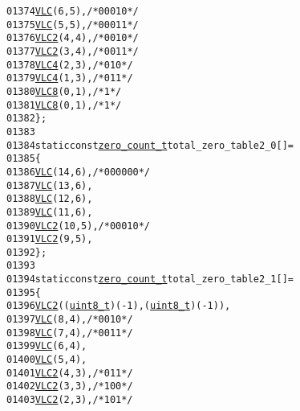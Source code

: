 \begin{footnotesize}
\begin{alltt}
01374         \hyperlink{vlc_8h_a7f3572774a720fd9b4bc3b1a0b65082f}{VLC}(6, 5), \textcolor{comment}{/* 0001 0 */}
01375         \hyperlink{vlc_8h_a7f3572774a720fd9b4bc3b1a0b65082f}{VLC}(5, 5), \textcolor{comment}{/* 0001 1 */}
01376         \hyperlink{vlc_8h_ad3cda36b9c6132357c7f7de5e52a6c93}{VLC2}(4, 4),\textcolor{comment}{/* 0010 */}
01377         \hyperlink{vlc_8h_ad3cda36b9c6132357c7f7de5e52a6c93}{VLC2}(3, 4),\textcolor{comment}{/* 0011 */}
01378         \hyperlink{vlc_8h_a02cdc921d8f03450b12879e8afb222cb}{VLC4}(2, 3),\textcolor{comment}{/* 010 */}
01379         \hyperlink{vlc_8h_a02cdc921d8f03450b12879e8afb222cb}{VLC4}(1, 3),\textcolor{comment}{/* 011 */}
01380         \hyperlink{vlc_8h_a0a94088f44f593387fb86112a6c7da9c}{VLC8}(0, 1), \textcolor{comment}{/*1 */}
01381         \hyperlink{vlc_8h_a0a94088f44f593387fb86112a6c7da9c}{VLC8}(0, 1), \textcolor{comment}{/*1 */}
01382 \};
01383 
01384 \textcolor{keyword}{static} \textcolor{keyword}{const} \hyperlink{structzero__count__t}{zero_count_t} total\_zero\_table2\_0[] = 
01385 \{
01386         \hyperlink{vlc_8h_a7f3572774a720fd9b4bc3b1a0b65082f}{VLC}(14, 6), \textcolor{comment}{/* 0000 00 */}
01387         \hyperlink{vlc_8h_a7f3572774a720fd9b4bc3b1a0b65082f}{VLC}(13, 6),
01388         \hyperlink{vlc_8h_a7f3572774a720fd9b4bc3b1a0b65082f}{VLC}(12, 6),
01389         \hyperlink{vlc_8h_a7f3572774a720fd9b4bc3b1a0b65082f}{VLC}(11, 6),
01390         \hyperlink{vlc_8h_ad3cda36b9c6132357c7f7de5e52a6c93}{VLC2}(10, 5),\textcolor{comment}{/* 0001 0 */}
01391         \hyperlink{vlc_8h_ad3cda36b9c6132357c7f7de5e52a6c93}{VLC2}(9, 5),
01392 \};
01393 
01394 \textcolor{keyword}{static} \textcolor{keyword}{const} \hyperlink{structzero__count__t}{zero_count_t} total\_zero\_table2\_1[] = 
01395 \{
01396         \hyperlink{vlc_8h_ad3cda36b9c6132357c7f7de5e52a6c93}{VLC2}((\hyperlink{_types_8h_a363e4d606232036a6b89060813c45489}{uint8_t})(-1), (\hyperlink{_types_8h_a363e4d606232036a6b89060813c45489}{uint8_t})(-1)),
01397         \hyperlink{vlc_8h_a7f3572774a720fd9b4bc3b1a0b65082f}{VLC}(8, 4), \textcolor{comment}{/* 0010 */}
01398         \hyperlink{vlc_8h_a7f3572774a720fd9b4bc3b1a0b65082f}{VLC}(7, 4), \textcolor{comment}{/* 0011 */}
01399         \hyperlink{vlc_8h_a7f3572774a720fd9b4bc3b1a0b65082f}{VLC}(6, 4),
01400         \hyperlink{vlc_8h_a7f3572774a720fd9b4bc3b1a0b65082f}{VLC}(5, 4),
01401         \hyperlink{vlc_8h_ad3cda36b9c6132357c7f7de5e52a6c93}{VLC2}(4, 3),\textcolor{comment}{/* 011 */}
01402         \hyperlink{vlc_8h_ad3cda36b9c6132357c7f7de5e52a6c93}{VLC2}(3, 3),\textcolor{comment}{/* 100 */}
01403         \hyperlink{vlc_8h_ad3cda36b9c6132357c7f7de5e52a6c93}{VLC2}(2, 3), \textcolor{comment}{/*101 */}

\end{alltt}
\end{footnotesize}
